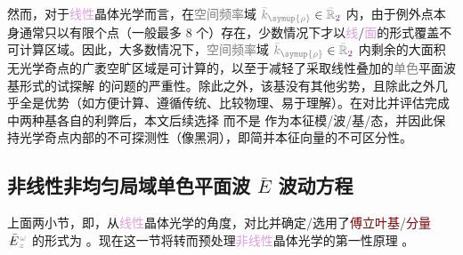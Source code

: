 然而，对于\textcolor{Plum}{线性}\textcolor{PineGreen}{晶体光学}而言，在\textcolor{gray}{空间频率}域 $\mathcolor{gray}{\bar{k}_{\symup{\rho}}} \in \mathcolor{gray}{\bar{\mathbb{R}}_{\textcolor{Plum}{2}}}$ 内，由于\textcolor{PineGreen}{例外点}本身通常只以有限个点（一般最多 8 个\cite{berryOpticalSingularitiesBirefringent2003,berryOpticalSingularitiesBianisotropic2005,sturmPropagationElectromagneticWaves,sturmSingularOpticalAxes2016a,grundmannOpticallyAnisotropicMedia2017}）存在，少数情况下才以\textcolor{Plum}{线}/\textcolor{Plum}{面}的形式覆盖不可计算区域\cite{xieAnalytic3DVector}。因此，大多数情况下，\textcolor{gray}{空间频率}域 $\mathcolor{gray}{\bar{k}_{\symup{\rho}}} \in \mathcolor{gray}{\bar{\mathbb{R}}_{\textcolor{Plum}{2}}}$ 内剩余的大面积无\textcolor{PineGreen}{光学奇点}的广袤空旷区域是可计算的，以至于减轻了采取\textcolor{PineGreen}{线性叠加}的\textcolor{gray}{单色}\textcolor{PineGreen}{平面波基}形式的试探解  的问题的严重性。除此之外，该基没有其他劣势，且除此之外几乎全是优势（如方便计算、遵循传统、比较\textcolor{NavyBlue}{物理}、易于理解）。在对比并评估完成  中\textcolor{PineGreen}{两种基}各自的利弊后，本文后续选择  而不是  作为\textcolor{PineGreen}{本征模}/波/基/态，并因此保持\textcolor{PineGreen}{光学奇点}内部的不可探测性（像黑洞），即简并\textcolor{PineGreen}{本征向量}的不可区分性。


\vspace*{-4.5em}

\subsection{非线性非均匀局域单色平面波 $\bar{E}$ 波动方程}\label{ssec:E-waveq-nonlinear}

上面两小节，即，从\textcolor{Plum}{线性}\textcolor{PineGreen}{晶体光学}的角度，对比并确定/选用了\textcolor{Maroon}{傅立叶基}/\textcolor{Maroon}{分量} $\xint{\mathcolor{gray}{-}}{25}{\bar{E}}^{\;\!\mathcolor{gray}{\omega}}_{\;\! \mathcolor{gray}{z}}$ 的形式为 。现在这一节将转而预处理\textcolor{Plum}{非线性}\textcolor{PineGreen}{晶体光学}的\textcolor{NavyBlue}{第一性原理} 。

